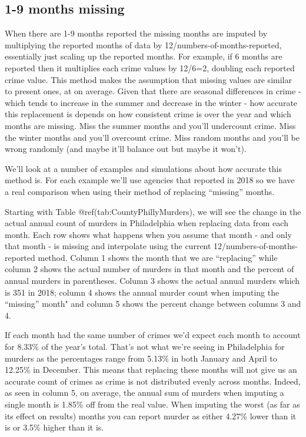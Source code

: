 \documentclass[
  12pt,
  openany]{book}
\begin{document}
\hypertarget{months-missing}{%
\subsection{1-9 months missing}\label{months-missing}}

When there are 1-9 months reported the missing months are imputed by multiplying the reported months of data by 12/numbers-of-months-reported, essentially just scaling up the reported months. For example, if 6 months are reported then it multiplies each crime values by 12/6=2, doubling each reported crime value. This method makes the assumption that missing values are similar to present ones, at on average. Given that there are seasonal differences in crime - which tends to increase in the summer and decrease in the winter - how accurate this replacement is depends on how consistent crime is over the year and which months are missing. Miss the summer months and you'll undercount crime. Miss the winter months and you'll overcount crime. Miss random months and you'll be wrong randomly (and maybe it'll balance out but maybe it won't).

We'll look at a number of examples and simulations about how accurate this method is. For each example we'll use agencies that reported in 2018 so we have a real comparison when using their method of replacing ``missing'' months.

Starting with Table @ref(tab:CountyPhillyMurders), we will see the change in the actual annual count of murders in Philadelphia when replacing data from each month. Each row shows what happens when you assume that month - and only that month - is missing and interpolate using the current 12/numbers-of-months-reported method. Column 1 shows the month that we are ``replacing'' while column 2 shows the actual number of murders in that month and the percent of annual murders in parentheses. Column 3 shows the actual annual murders which is 351 in 2018; column 4 shows the annual murder count when imputing the ``missing'' month" and column 5 shows the percent change between columns 3 and 4.

If each month had the same number of crimes we'd expect each month to account for 8.33\% of the year's total. That's not what we're seeing in Philadelphia for murders as the percentages range from 5.13\% in both January and April to 12.25\% in December. This means that replacing these months will not give us an accurate count of crimes as crime is not distributed evenly across months. Indeed, as seen in column 5, on average, the annual sum of murders when imputing a single month is 1.85\% off from the real value. When imputing the worst (as far as its effect on results) months you can report murder as either 4.27\% lower than it is or 3.5\% higher than it is.
\end{document}
